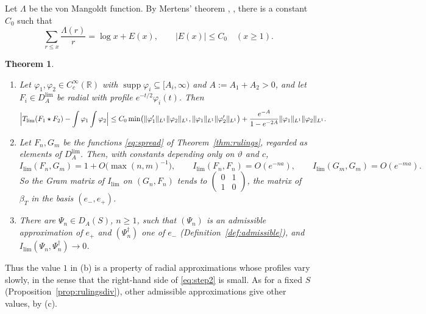 \documentclass[11pt]{amsart}
\newtheorem{theorem}{Theorem}[section]
\theoremstyle{definition}
\theoremstyle{remark}
\newcommand{\R}{\mathbb R}
\newcommand{\supp}{\operatorname{supp}}
\newcommand{\DA}{D_A}
\begin{document}
Let $\Lambda$ be the von Mangoldt function.  By Mertens' theorem
\cite{Mertens}, \cite[Theorem~2.7]{MontgomeryVaughan},
there is a constant $C_0$ such that
\begin{equation}\label{eq:mertenssum}
\sum_{r\le x}\frac{\Lambda(r)}{r}=\log x+E(x),\qquad|E(x)|\le C_0\quad(x\ge1).
\end{equation}

\begin{theorem}\label{thm:mertens}
\begin{enumerate}
\item[(a)] Let $\varphi_1,\varphi_2\in C_c^{\infty}(\R)$ with
$\supp\varphi_i\subseteq[A_i,\infty)$ and $A:=A_1+A_2>0$, and let
$F_i\in\DA^{\lim}$ be radial with profile $e^{-t/2}\varphi_i(t)$.  Then
\begin{equation}\label{eq:step2}
\Bigl|T_{\lim}(F_1\star F_2)-\int\varphi_1\int\varphi_2\Bigr|
\le C_0\min\bigl(\lVert\varphi_1'\rVert_{L^1}\lVert\varphi_2\rVert_{L^1},
\lVert\varphi_1\rVert_{L^1}\lVert\varphi_2'\rVert_{L^1}\bigr)
+\frac{e^{-A}}{1-e^{-2A}}\lVert\varphi_1\rVert_{L^1}\lVert\varphi_2\rVert_{L^1}.
\end{equation}
\item[(b)] Let $F_n,G_m$ be the functions \eqref{eq:spread} of
Theorem~\ref{thm:rulings}, regarded as elements of $\DA^{\lim}$.  Then, with constants depending only on $\vartheta$ and $c$,
\begin{equation}\label{eq:mertenslimit}
I_{\lim}(F_n,G_m)=1+O\bigl(\max(n,m)^{-1}\bigr),\qquad
I_{\lim}(F_n,F_n)=O(e^{-na}),\qquad I_{\lim}(G_m,G_m)=O(e^{-ma}).
\end{equation}
So the Gram matrix of $I_{\lim}$ on $(G_n,F_n)$ tends to
$\left(\begin{smallmatrix}0&1\\1&0\end{smallmatrix}\right)$, the matrix of
$\beta_T$ in the basis $(e_-,e_+)$.
\item[(c)] There are $\Psi_n\in\DA(S)$, $n\ge1$, such that $(\Psi_n)$ is an
admissible approximation of $e_+$ and $(\Psi_n^{\dagger})$ one of $e_-$
(Definition~\ref{def:admissible}), and $I_{\lim}(\Psi_n,\Psi_n^{\dagger})\to0$.
\end{enumerate}
\end{theorem}

Thus the value $1$ in (b) is a property of radial approximations whose
profiles vary slowly, in the sense that the right-hand side of
\eqref{eq:step2} is small.  As for a fixed $S$
(Proposition~\ref{prop:rulingsdiv}), other admissible approximations give
other values, by (c).
\end{document}
